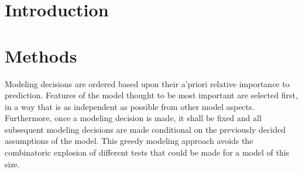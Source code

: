 \documentclass[12pt]{article}
\begin{document}
%
\clearpage
\onehalfspacing
%

%
%
\section{Introduction}\label{introduction}
%
%


%
%
\section{Methods}\label{methods}
%
%


Modeling decisions are ordered based upon their a'priori relative importance to 
prediction. Features of the model thought to be most important are 
selected first, in a way that is as independent as possible from other model 
aspects. Furthermore, once a modeling decision is made, it shall be fixed and 
all subsequent modeling decisions are made conditional on the previously 
decided assumptions of the model. This greedy modeling approach avoids the 
combinatoric explosion of different tests that could be made for a model of 
this size.

\end{document}
